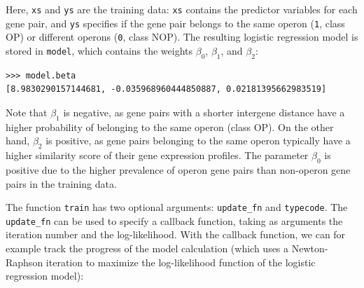 \documentclass{report}
\begin{document}
Here, \verb+xs+ and \verb+ys+ are the training data: \verb+xs+ contains the predictor variables for each gene pair, and \verb+ys+ specifies if the gene pair belongs to the same operon (\verb+1+, class OP) or different operons (\verb+0+, class NOP). The resulting logistic regression model is stored in \verb+model+, which contains the weights $\beta_0$, $\beta_1$, and $\beta_2$:

\begin{verbatim}
>>> model.beta
[8.9830290157144681, -0.035968960444850887, 0.02181395662983519]
\end{verbatim}

Note that $\beta_1$ is negative, as gene pairs with a shorter intergene distance have a higher probability of belonging to the same operon (class OP). On the other hand, $\beta_2$ is positive, as gene pairs belonging to the same operon typically have a higher similarity score of their gene expression profiles.
The parameter $\beta_0$ is positive due to the higher prevalence of operon gene pairs than non-operon gene pairs in the training data.

The function \verb+train+ has two optional arguments: \verb+update_fn+ and \verb+typecode+. The \verb+update_fn+ can be used to specify a callback function, taking as arguments the iteration number and the log-likelihood. With the callback function, we can for example track the progress of the model calculation (which uses a Newton-Raphson iteration to maximize the log-likelihood function of the logistic regression model):
\end{document}

